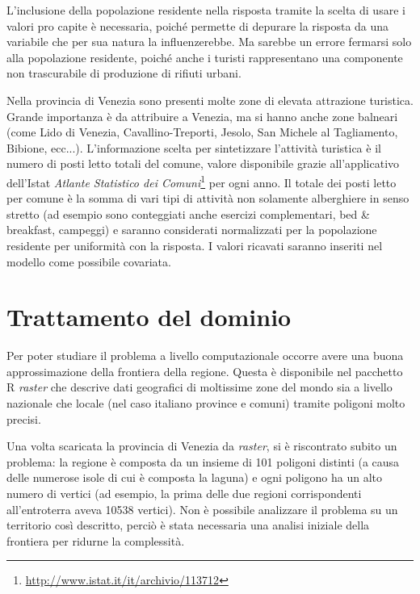 \documentclass[a4paper,11pt,twoside,openright]{book}							%
\begin{document}
L'inclusione della popolazione residente nella risposta tramite la scelta di usare i valori pro capite è necessaria, poiché permette di depurare la risposta da una variabile che per sua natura la influenzerebbe. Ma sarebbe un errore fermarsi solo alla popolazione residente, poiché anche i turisti rappresentano una componente non trascurabile di produzione di rifiuti urbani.

Nella provincia di Venezia sono presenti molte zone di elevata attrazione turistica. Grande importanza è da attribuire a Venezia, ma si hanno anche zone balneari (come Lido di Venezia, Cavallino-Treporti, Jesolo, San Michele al Tagliamento, Bibione, ecc...). L'informazione scelta per sintetizzare l'attività turistica è il numero di posti letto totali del comune, valore disponibile grazie all'applicativo dell'Istat \textit{Atlante Statistico dei Comuni}\footnote{\href{http://www.istat.it/it/archivio/113712}{http://www.istat.it/it/archivio/113712}} per ogni anno. Il totale dei posti letto per comune è la somma di vari tipi di attività non solamente alberghiere in senso stretto (ad esempio sono conteggiati anche esercizi complementari, bed \& breakfast, campeggi) e saranno considerati normalizzati per la popolazione residente per uniformità con la risposta. I valori ricavati saranno inseriti nel modello come possibile covariata.


\section{Trattamento del dominio}

Per poter studiare il problema a livello computazionale occorre avere una buona approssimazione della frontiera della regione. Questa è disponibile nel pacchetto R \textit{raster} che descrive dati geografici di moltissime zone del mondo sia a livello nazionale che locale (nel caso italiano province e comuni) tramite poligoni molto precisi.

Una volta scaricata la provincia di Venezia da \textit{raster}, si è riscontrato subito un problema: la regione è composta da un insieme di 101 poligoni distinti (a causa delle numerose isole di cui è composta la laguna) e ogni poligono ha un alto numero di vertici (ad esempio, la prima delle due regioni corrispondenti all'entroterra aveva 10538 vertici). Non è possibile analizzare il problema su un territorio così descritto, perciò è stata necessaria una analisi iniziale della frontiera per ridurne la complessità. 
\end{document}
